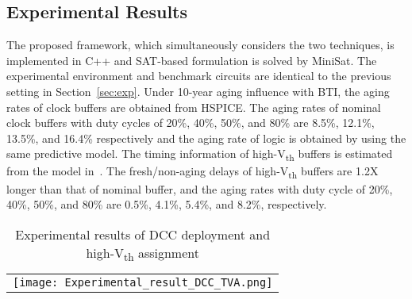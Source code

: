 \subsection{Experimental Results}
\label{sec:TVA:experiment}
The proposed framework, which simultaneously considers the two techniques, is implemented in C++ and SAT-based formulation is solved by MiniSat. The experimental environment and benchmark circuits are identical to the previous setting in Section~\ref{sec:exp}.
Under 10-year aging influence with BTI, the aging rates of clock buffers are obtained from HSPICE. The aging rates of nominal clock buffers with duty cycles of 20\%, 40\%, 50\%, and 80\% are 8.5\%, 12.1\%, 13.5\%, and 16.4\% respectively and the aging rate of logic is obtained by using the same predictive model. The timing information of high-V\textsubscript{th} buffers is estimated from the model in~\cite{andres2016}. The fresh/non-aging delays of high-V\textsubscript{th} buffers are 1.2X longer than that of nominal buffer, and the aging rates with duty cycle of 20\%, 40\%, 50\%, and 80\% are 0.5\%, 4.1\%, 5.4\%, and 8.2\%, respectively.

\begin{table*}
\centering
\caption{Experimental results of DCC deployment and high-V\textsubscript{th} assignment}
	\begin{tabular}{l}
	\texttt{[image: Experimental\_result\_DCC\_TVA.png]}
	\end{tabular}
\label{table:exp2}
\end{table*}

